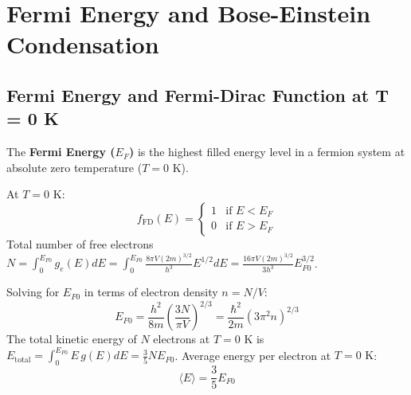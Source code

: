 \documentclass[12pt,a4paper]{article}
\begin{document}
\section{Fermi Energy and Bose-Einstein Condensation}

\subsection{Fermi Energy and Fermi-Dirac Function at T = 0 K}

The \textbf{Fermi Energy ($E_F$)} is the highest filled energy level in a fermion system at absolute zero temperature ($T = 0\text{ K}$).

At $T = 0\text{ K}$:
\begin{equation}
f_{\text{FD}}(E) = 
\begin{cases} 
1 & \text{if } E < E_F \\ 
0 & \text{if } E > E_F 
\end{cases}
\end{equation}
Total number of free electrons $N = \int_0^{E_{F0}} g_e(E) dE = \int_0^{E_{F0}} \frac{8\pi V (2m)^{3/2}}{h^3} E^{1/2} dE = \frac{16\pi V (2m)^{3/2}}{3 h^3} E_{F0}^{3/2}$.

\begin{tcolorbox}[formulabox, title={\textbf{Fermi Energy and Average Energy at T = 0 K}}]
Solving for $E_{F0}$ in terms of electron density $n = N/V$:
\begin{equation}
E_{F0} = \frac{h^2}{8m} \left( \frac{3 N}{\pi V} \right)^{2/3} = \frac{\hbar^2}{2m} (3\pi^2 n)^{2/3}
\end{equation}
The total kinetic energy of $N$ electrons at $T = 0\text{ K}$ is $E_{\text{total}} = \int_0^{E_{F0}} E \, g(E) dE = \frac{3}{5} N E_{F0}$.
Average energy per electron at $T = 0\text{ K}$:
\begin{equation}
\langle E \rangle = \frac{3}{5} E_{F0}
\end{equation}
\end{tcolorbox}
\end{document}
